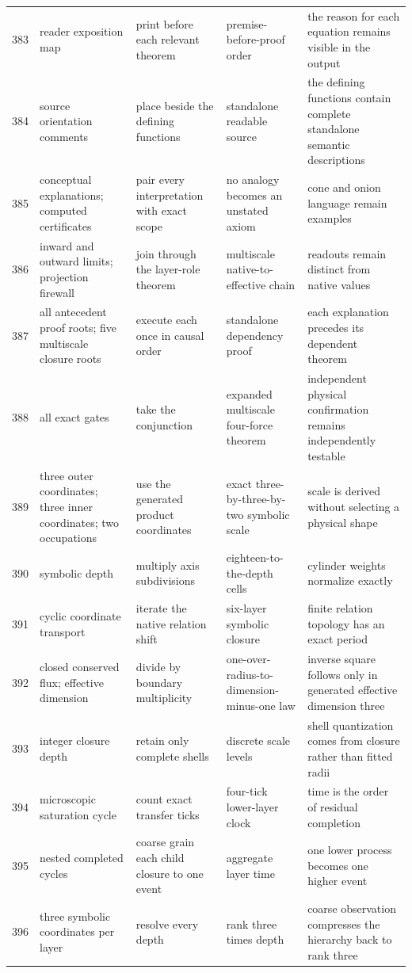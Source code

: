 \documentclass[11pt]{article}
\numberwithin{equation}{section}
\theoremstyle{remark}
\begin{document}
\begin{landscape}
\begin{longtable}{p{0.65cm}p{3.5cm}p{4.0cm}p{4.0cm}p{4.6cm}}
383&reader exposition map&print before each relevant theorem&premise-before-proof order&the reason for each equation remains visible in the output\\
384&source orientation comments&place beside the defining functions&standalone readable source&the defining functions contain complete standalone semantic descriptions\\
385&conceptual explanations; computed certificates&pair every interpretation with exact scope&no analogy becomes an unstated axiom&cone and onion language remain examples\\
386&inward and outward limits; projection firewall&join through the layer-role theorem&multiscale native-to-effective chain&readouts remain distinct from native values\\
387&all antecedent proof roots; five multiscale closure roots&execute each once in causal order&standalone dependency proof&each explanation precedes its dependent theorem\\
388&all exact gates&take the conjunction&expanded multiscale four-force theorem&independent physical confirmation remains independently testable\\
389&three outer coordinates; three inner coordinates; two occupations&use the generated product coordinates&exact three-by-three-by-two symbolic scale&scale is derived without selecting a physical shape\\
390&symbolic depth&multiply axis subdivisions&eighteen-to-the-depth cells&cylinder weights normalize exactly\\
391&cyclic coordinate transport&iterate the native relation shift&six-layer symbolic closure&finite relation topology has an exact period\\
392&closed conserved flux; effective dimension&divide by boundary multiplicity&one-over-radius-to-dimension-minus-one law&inverse square follows only in generated effective dimension three\\
393&integer closure depth&retain only complete shells&discrete scale levels&shell quantization comes from closure rather than fitted radii\\
394&microscopic saturation cycle&count exact transfer ticks&four-tick lower-layer clock&time is the order of residual completion\\
395&nested completed cycles&coarse grain each child closure to one event&aggregate layer time&one lower process becomes one higher event\\
396&three symbolic coordinates per layer&resolve every depth&rank three times depth&coarse observation compresses the hierarchy back to rank three\\

\end{longtable}
\end{landscape}
\end{document}

